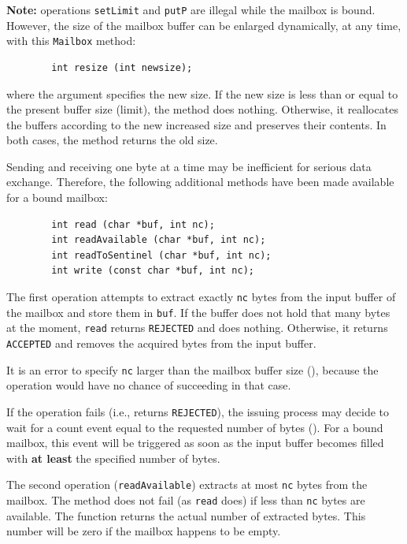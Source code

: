 \noindent
{\bf Note:} operations {\tt setLimit} and {\tt putP} are illegal while the
mailbox is bound.
However, the size of the mailbox buffer can be enlarged dynamically, at any
time, with this {\tt Mailbox} method:

\begin{verbatim}
        int resize (int newsize);
\end{verbatim}
where the argument specifies the new size.
If the new size is less than or equal to the present buffer size (limit),
the method does nothing.
Otherwise, it reallocates the buffers according to the new increased size
and preserves their contents.
In both cases, the method returns the old size.

\medskip

Sending and receiving one byte at a time may be inefficient for serious
data exchange.
Therefore, the following additional methods have been made available
for a bound mailbox:
\begin{verbatim}
        int read (char *buf, int nc);
        int readAvailable (char *buf, int nc);
        int readToSentinel (char *buf, int nc);
        int write (const char *buf, int nc);
\end{verbatim}

The first operation attempts to extract exactly {\tt nc} bytes from the
input buffer of the mailbox and store them in {\tt buf}.
If the buffer does not hold that many bytes at the moment, {\tt read} returns
{\tt REJECTED} and does nothing.
Otherwise, it returns {\tt ACCEPTED} and removes the acquired bytes from
the input buffer.

It is an error to specify {\tt nc} larger than the mailbox buffer size
(), because the operation would have no chance of
succeeding in that case.

If the operation fails (i.e., returns {\tt REJECTED}), the issuing process
may decide to wait for a count event equal to the requested number of bytes
().
For a bound mailbox, this event will be triggered as soon as the input
buffer becomes filled with {\bf at least} the specified number of bytes.

\medskip

The second operation ({\tt readAvailable}) extracts at most {\tt nc}
bytes from the mailbox.
The method does not fail (as {\tt read} does) if less than {\tt nc} bytes
are available.
The function returns the actual number of extracted bytes.
This number will be zero if the mailbox happens to be empty.

